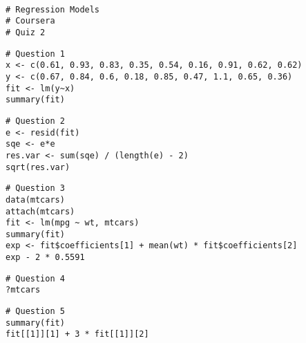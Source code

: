 \begin{frame}[fragile]
\begin{framed}
\begin{verbatim}

# Regression Models
# Coursera
# Quiz 2

\end{verbatim}
\end{framed}
\end{frame}
\begin{frame}[fragile]
\begin{framed}
\begin{verbatim}
# Question 1
x <- c(0.61, 0.93, 0.83, 0.35, 0.54, 0.16, 0.91, 0.62, 0.62)
y <- c(0.67, 0.84, 0.6, 0.18, 0.85, 0.47, 1.1, 0.65, 0.36)
fit <- lm(y~x)
summary(fit)
\end{verbatim}
\end{framed}
\end{frame}
\begin{frame}[fragile]
\begin{framed}
\begin{verbatim}
# Question 2
e <- resid(fit)
sqe <- e*e
res.var <- sum(sqe) / (length(e) - 2)
sqrt(res.var)  
\end{verbatim}
\end{framed}
\end{frame}
\begin{frame}[fragile]
\begin{framed}
\begin{verbatim}
# Question 3
data(mtcars)
attach(mtcars)
fit <- lm(mpg ~ wt, mtcars)
summary(fit)
exp <- fit$coefficients[1] + mean(wt) * fit$coefficients[2]
exp - 2 * 0.5591
\end{verbatim}
\end{framed}
\end{frame}
\begin{frame}[fragile]
\begin{framed}
\begin{verbatim}
# Question 4
?mtcars
\end{verbatim}
\end{framed}
\end{frame}
\begin{frame}[fragile]
\begin{framed}
\begin{verbatim}
# Question 5
summary(fit)
fit[[1]][1] + 3 * fit[[1]][2]
\end{verbatim}
\end{framed}
\end{frame}
